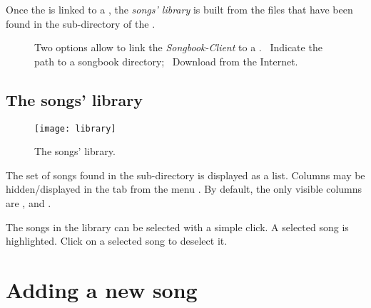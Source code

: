 Once the \client{} is linked to a \recueil{}, the \emph{songs'
  library} is built from the  files that have been found in
the  sub-directory of the \recueil{}.


\begin{figure}
  \centering
  \hspace{0.1cm}%
  \caption{%
    Two options allow to link the \emph{Songbook-Client} to a \recueil{}.
    ~Indicate the path to a songbook directory;%
    ~Download from the Internet.%
  }%
  \label{fig:solutions}
\end{figure}


\subsection{The songs' library}

\begin{figure}
  \centering
  \texttt{[image: library]}
  \caption{The songs' library.}
  \label{fig:library}
\end{figure}

The set of  songs found in the  sub-directory
is displayed as a list. Columns may be hidden/displayed in the tab
 from the menu . By
default, the only visible columns are ,  and
.

The songs in the library can be selected with a simple click.  A
selected song is highlighted. Click on a selected song to deselect it.

\section{Adding a new song}

